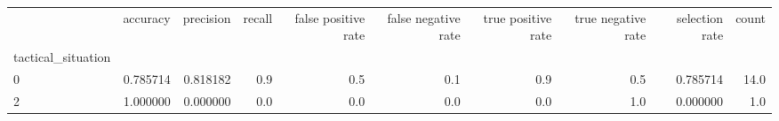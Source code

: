 \begin{tabular}{lrrrrrrrrr}
\toprule
{} &  accuracy &  precision &  recall &  false positive rate &  false negative rate &  true positive rate &  true negative rate &  selection rate &  count \\
tactical\_situation &           &            &         &                      &                      &                     &                     &                 &        \\
\midrule
0                  &  0.785714 &   0.818182 &     0.9 &                  0.5 &                  0.1 &                 0.9 &                 0.5 &        0.785714 &   14.0 \\
2                  &  1.000000 &   0.000000 &     0.0 &                  0.0 &                  0.0 &                 0.0 &                 1.0 &        0.000000 &    1.0 \\
\bottomrule
\end{tabular}
